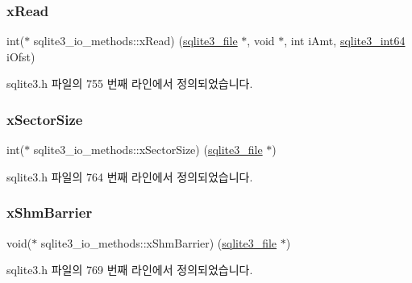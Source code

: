 \subsubsection{\texorpdfstring{x\+Read}{xRead}}
{\footnotesize\ttfamily int($\ast$ sqlite3\+\_\+io\+\_\+methods\+::x\+Read) (\hyperlink{structsqlite3__file}{sqlite3\+\_\+file} $\ast$, void $\ast$, int i\+Amt, \hyperlink{sqlite3_8h_a0a4d3e6c1ad46f90e746b920ab6ca0d2}{sqlite3\+\_\+int64} i\+Ofst)}



sqlite3.\+h 파일의 755 번째 라인에서 정의되었습니다.

\mbox{\label{structsqlite3__io__methods_a7a1c0cf3c4de6402a69f50e625be5ca2}} 
\subsubsection{\texorpdfstring{x\+Sector\+Size}{xSectorSize}}
{\footnotesize\ttfamily int($\ast$ sqlite3\+\_\+io\+\_\+methods\+::x\+Sector\+Size) (\hyperlink{structsqlite3__file}{sqlite3\+\_\+file} $\ast$)}



sqlite3.\+h 파일의 764 번째 라인에서 정의되었습니다.

\mbox{\label{structsqlite3__io__methods_aa4e436fef318c4702940da870f8e2710}} 
\subsubsection{\texorpdfstring{x\+Shm\+Barrier}{xShmBarrier}}
{\footnotesize\ttfamily void($\ast$ sqlite3\+\_\+io\+\_\+methods\+::x\+Shm\+Barrier) (\hyperlink{structsqlite3__file}{sqlite3\+\_\+file} $\ast$)}



sqlite3.\+h 파일의 769 번째 라인에서 정의되었습니다.

\mbox{\label{structsqlite3__io__methods_a2dbd4777e8ebce36b91dd5d64aef9bbf}} 
